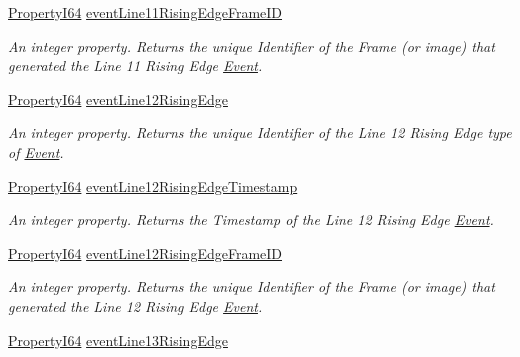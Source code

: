 \begin{DoxyCompactItemize}
\hyperlink{group___common_interface_ga81749b2696755513663492664a18a893}{Property\+I64} \hyperlink{classmv_i_m_p_a_c_t_1_1acquire_1_1_gen_i_cam_1_1_event_control_abf298f356a34ef56bad568ef0eaf8790}{event\+Line11\+Rising\+Edge\+Frame\+I\+D}
\begin{DoxyCompactList}\small\item\em An integer property. Returns the unique Identifier of the Frame (or image) that generated the Line 11 Rising Edge \hyperlink{classmv_i_m_p_a_c_t_1_1acquire_1_1_event}{Event}. \end{DoxyCompactList}\item 
\hyperlink{group___common_interface_ga81749b2696755513663492664a18a893}{Property\+I64} \hyperlink{classmv_i_m_p_a_c_t_1_1acquire_1_1_gen_i_cam_1_1_event_control_a48e02ac4da89eb63ac5c7d58e3f6b167}{event\+Line12\+Rising\+Edge}
\begin{DoxyCompactList}\small\item\em An integer property. Returns the unique Identifier of the Line 12 Rising Edge type of \hyperlink{classmv_i_m_p_a_c_t_1_1acquire_1_1_event}{Event}. \end{DoxyCompactList}\item 
\hyperlink{group___common_interface_ga81749b2696755513663492664a18a893}{Property\+I64} \hyperlink{classmv_i_m_p_a_c_t_1_1acquire_1_1_gen_i_cam_1_1_event_control_aef9c079af01791b023f8ce0e88c9ee31}{event\+Line12\+Rising\+Edge\+Timestamp}
\begin{DoxyCompactList}\small\item\em An integer property. Returns the Timestamp of the Line 12 Rising Edge \hyperlink{classmv_i_m_p_a_c_t_1_1acquire_1_1_event}{Event}. \end{DoxyCompactList}\item 
\hyperlink{group___common_interface_ga81749b2696755513663492664a18a893}{Property\+I64} \hyperlink{classmv_i_m_p_a_c_t_1_1acquire_1_1_gen_i_cam_1_1_event_control_a83ba895a2309cb03b49488cefb322807}{event\+Line12\+Rising\+Edge\+Frame\+I\+D}
\begin{DoxyCompactList}\small\item\em An integer property. Returns the unique Identifier of the Frame (or image) that generated the Line 12 Rising Edge \hyperlink{classmv_i_m_p_a_c_t_1_1acquire_1_1_event}{Event}. \end{DoxyCompactList}\item 
\hyperlink{group___common_interface_ga81749b2696755513663492664a18a893}{Property\+I64} \hyperlink{classmv_i_m_p_a_c_t_1_1acquire_1_1_gen_i_cam_1_1_event_control_a852c08e0a9e24c1a04af5b37a2f6c358}{event\+Line13\+Rising\+Edge}

\end{DoxyCompactItemize}
